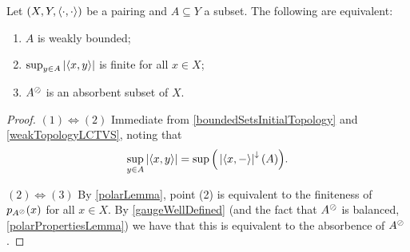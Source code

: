 \begin{lemma} \label{weaklyBoundedLemma}
Let $\left( X,Y,\left\langle \cdot,\cdot \right\rangle \right)$ be a pairing and $A\subseteq Y$ a subset. The following are equivalent:
\begin{enumerate}
\item $A$ is weakly bounded;
\item $\sup_{y\in A}\left|\left\langle x, y \right\rangle\right|$ is finite for all $x\in X$;
\item $A^\oslash$ is an absorbent subset of $X$.
\end{enumerate}
\end{lemma}
\begin{proof}
$(1) \Leftrightarrow (2)$ Immediate from \ref{boundedSetsInitialTopology} and \ref{weakTopologyLCTVS}, noting that
\[ \sup_{y\in A}\left|\left\langle x, y \right\rangle\right| = \sup\Big(\left|\left\langle x,- \right\rangle\right|^{\downarrow}(A)\Big). \]

$(2) \Leftrightarrow (3)$ By \ref{polarLemma}, point (2) is equivalent to the finiteness of $p_{A^\oslash}(x)$ for all $x\in X$. By \ref{gaugeWellDefined} (and the fact that $A^\oslash$ is balanced, \ref{polarPropertiesLemma}) we have that this is equivalent to the absorbence of $A^\oslash$.
\end{proof}

